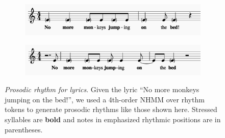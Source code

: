 \documentclass[phd,electronic,oneside,twosidetoc,letterpaper,chaptercenter,parttop,lol,lof,lot]{byumsphd}
\begin{document}
\begin{figure}
    \centering
    \begin{subfigure}[b]{\linewidth}
        \includegraphics[width=\linewidth]{monkeys_2}
    \end{subfigure}
    \begin{subfigure}[b]{\linewidth}
        \includegraphics[width=\linewidth]{monkeys_3}
    \end{subfigure}
    \caption{\textit{Prosodic rhythm for lyrics}. Given the lyric ``No more monkeys jumping on the bed!'', we used a 4th-order NHMM over rhythm tokens to generate prosodic rhythms like those shown here. Stressed syllables are \textbf{bold} and notes in emphasized rhythmic positions are in parentheses.}
    \label{fig:monkeys}
\end{figure}



\end{document}
